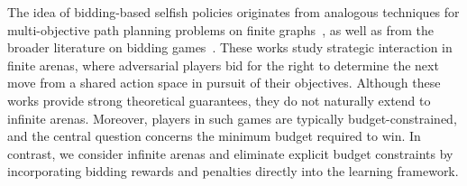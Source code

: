 The idea of bidding-based selfish policies originates from analogous techniques for multi-objective path planning problems on finite graphs~\citep{avni2024auction}, as well as from the broader literature on bidding games~\citep{lazarus1999combinatorial,avni2019infinite,avni2025bidding}. These works study strategic interaction in finite arenas, where adversarial players bid for the right to determine the next move from a shared action space in pursuit of their objectives. Although these works provide strong theoretical guarantees, they do not naturally extend to infinite arenas. Moreover, players in such games are typically budget-constrained, and the central question concerns the minimum budget required to win. In contrast, we consider infinite arenas and eliminate explicit budget constraints by incorporating bidding rewards and penalties directly into the learning framework.

